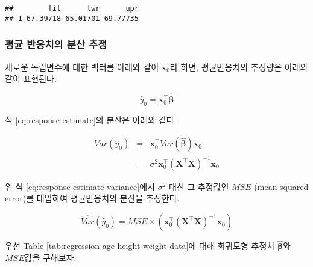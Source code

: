 \documentclass[]{book}
\begin{document}
\begin{verbatim}
##        fit      lwr      upr
## 1 67.39718 65.01701 69.77735
\end{verbatim}

\hypertarget{regression-response-confidence-variance}{%
\subsubsection{평균 반응치의 분산 추정}\label{regression-response-confidence-variance}}

새로운 독립변수에 대한 벡터를 아래와 같이 \(\mathbf{x}_0\)라 하면, 평균반응치의 추정량은 아래와 같이 표현된다.

\begin{equation}
\hat{y}_0 = \mathbf{x}_0^\top \hat{\boldsymbol{\beta}} \label{eq:response-estimate}
\end{equation}

식 \eqref{eq:response-estimate}의 분산은 아래와 같다.

\begin{eqnarray}
Var(\hat{y}_0) &=& \mathbf{x}_0^\top Var(\hat{\boldsymbol{\beta}}) \mathbf{x}_0\\
&=& \sigma^2 \mathbf{x}_0^\top \left(\mathbf{X}^\top \mathbf{X}\right)^{-1} \mathbf{x}_0 \label{eq:response-estimate-variance}
\end{eqnarray}

위 식 \eqref{eq:response-estimate-variance}에서 \(\sigma^2\) 대신 그 추정값인 \(MSE\) (mean squared error)를 대입하여 평균반응치의 분산을 추정한다.

\begin{equation}
\hat{Var}(\hat{y}_0) = MSE \times \left( \mathbf{x}_0^\top \left(\mathbf{X}^\top \mathbf{X}\right)^{-1} \mathbf{x}_0 \right) \label{eq:response-estimate-variance-est}
\end{equation}

우선 Table \ref{tab:regression-age-height-weight-data}에 대해 회귀모형 추정치 \(\hat{\boldsymbol{\beta}}\)와 \(MSE\)값을 구해보자.
\end{document}

